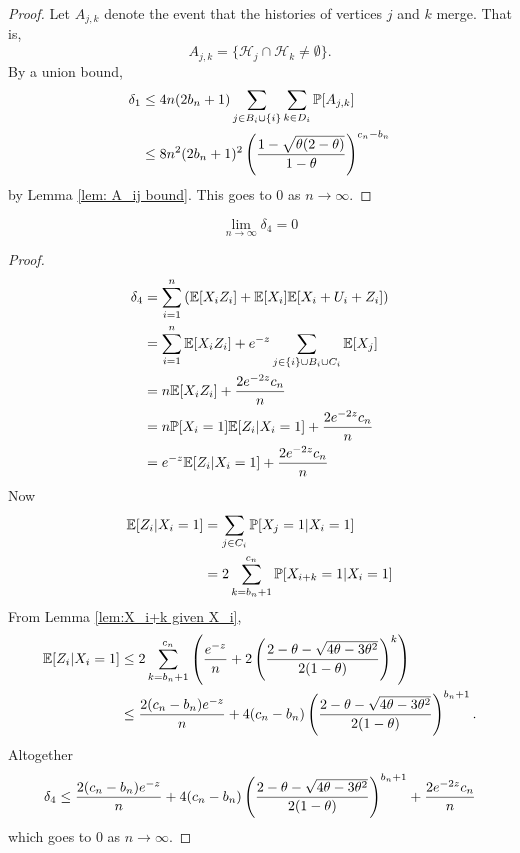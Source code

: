 \begin{proof}
		Let $A_{j,k}$ denote the event that the histories of vertices $j$ and $k$ merge. That is,
		\begin{equation}
			A_{j,k} = \{\mathcal{H}_j \cap \mathcal{H}_k \neq \emptyset\}.
		\end{equation}
		By a union bound,
		\begin{align}
			\delta_1 &\leq 4 n (2b_n + 1) \sum_{j \in B_i \cup \{i\}} \sum_{k \in D_i} \mathbb{P}[A_{j,k}]\\
			&\leq 8n^2(2b_n + 1)^2  \left(\frac{1 - \sqrt{\theta(2 - \theta)}}{1 - \theta}\right)^{c_n - b_n}
		\end{align}
		by Lemma \ref{lem: A_ij bound}. This goes to $0$ as $n \rightarrow \infty$.
	\end{proof}

	\begin{lemma}
	\label{lem:delta4 goes to 0}
		\begin{equation}
			\lim_{n\rightarrow\infty} \delta_4 = 0
		\end{equation}
	\end{lemma}
	\begin{proof}
		\begin{align}
			\delta_4 &= \sum_{i = 1}^n \left(\mathbb{E}[X_i Z_i] + \mathbb{E}[X_i]\mathbb{E}[X_i + U_i + Z_i]\right)\\
				&= \sum_{i=1}^n \mathbb{E}[X_i Z_i] + e^{-z} \sum_{j \in \{i\}\cup B_i \cup C_i} \mathbb{E}[X_j]\\
				&= n \mathbb{E}[X_i Z_i] + \frac{2e^{-2z}c_n}{n}\\
				&= n \mathbb{P}[X_i = 1] \mathbb{E}[Z_i | X_i = 1] + \frac{2e^{-2z}c_n}{n}\\
				&= e^{-z}\mathbb{E}[Z_i | X_i = 1] + \frac{2e^{-2z}c_n}{n}
		\end{align}
		Now
		\begin{align}
			\mathbb{E}[Z_i | X_i = 1] &= \sum_{j \in C_i} \mathbb{P}[X_j = 1 | X_i = 1]\\
			&= 2 \sum_{k = b_n + 1}^{c_n} \mathbb{P}[X_{i+k} = 1 | X_i = 1]
		\end{align}
		From Lemma \ref{lem:X_i+k given X_i},
		\begin{align}
			\mathbb{E}[Z_i | X_i = 1] &\leq 2 \sum_{k = b_n + 1}^{c_n} \left(\frac{e^{-z}}{n} + 2\left(\frac{2 - \theta - \sqrt{4\theta - 3\theta^2}}{2(1 - \theta)}\right)^k\right)\\
				&\leq \frac{2(c_n - b_n)e^{-z}}{n} + 4(c_n - b_n)\left(\frac{2 - \theta - \sqrt{4\theta - 3\theta^2}}{2(1 - \theta)}\right)^{b_n + 1}.
		\end{align}
		Altogether
		\begin{equation}
			\delta_4 \leq \frac{2(c_n - b_n)e^{-z}}{n} + 4(c_n - b_n)\left(\frac{2 - \theta - \sqrt{4\theta - 3\theta^2}}{2(1 - \theta)}\right)^{b_n + 1} + \frac{2e^{-2z}c_n}{n}
		\end{equation}
		which goes to $0$ as $n \rightarrow \infty$.
	\end{proof}

